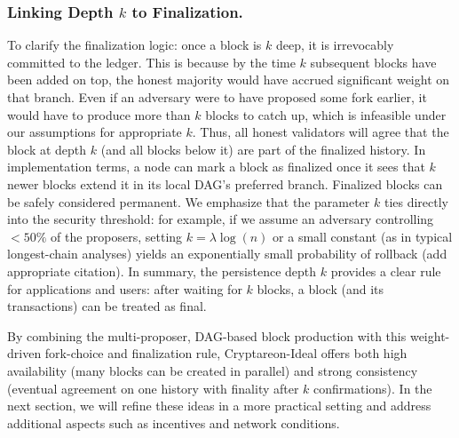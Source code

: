 \subsubsection*{Linking Depth $k$ to Finalization.} To clarify the finalization logic: once a block is $k$ deep, it is irrevocably committed to the ledger. This is because by the time $k$ subsequent blocks have been added on top, the honest majority would have accrued significant weight on that branch. Even if an adversary were to have proposed some fork earlier, it would have to produce more than $k$ blocks to catch up, which is infeasible under our assumptions for appropriate $k$. Thus, all honest validators will agree that the block at depth $k$ (and all blocks below it) are part of the finalized history. In implementation terms, a node can mark a block as finalized once it sees that $k$ newer blocks extend it in its local DAG’s preferred branch. Finalized blocks can be safely considered permanent. We emphasize that the parameter $k$ ties directly into the security threshold: for example, if we assume an adversary controlling $< 50\%$ of the proposers, setting $k = \lambda \log(n)$ or a small constant (as in typical longest-chain analyses) yields an exponentially small probability of rollback (add appropriate citation). In summary, the persistence depth $k$ provides a clear rule for applications and users: after waiting for $k$ blocks, a block (and its transactions) can be treated as final.

By combining the multi-proposer, DAG-based block production with this weight-driven fork-choice and finalization rule, Cryptareon-Ideal offers both high availability (many blocks can be created in parallel) and strong consistency (eventual agreement on one history with finality after $k$ confirmations). In the next section, we will refine these ideas in a more practical setting and address additional aspects such as incentives and network conditions.
